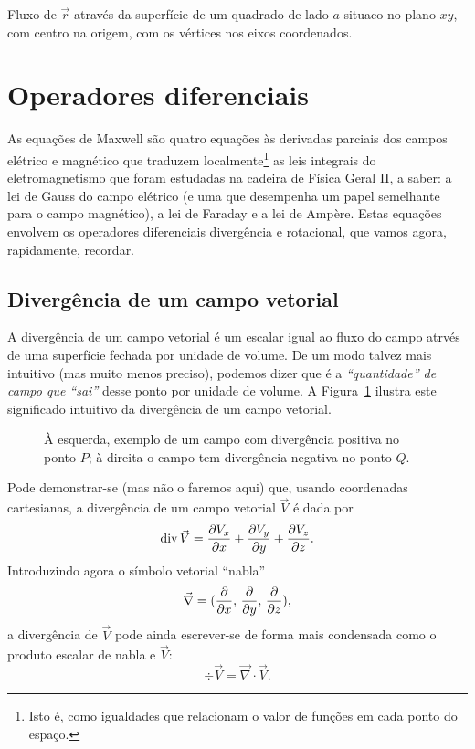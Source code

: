 \begin{examples}
\item Fluxo de $\vec r$ através da superfície de um quadrado de lado $a$ situaco
no plano $xy$, com centro na origem, com os vértices nos eixos coordenados.
\end{examples}

\section{Operadores diferenciais}
As equações de Maxwell são quatro equações às derivadas parciais dos campos
elétrico e magnético que traduzem localmente\footnote{Isto é, como igualdades
que relacionam o valor de funções em cada ponto do espaço.} as leis integrais
do eletromagnetismo que foram estudadas na cadeira de Física Geral II, a saber:
a lei de Gauss do campo elétrico (e uma que desempenha um papel semelhante para
o campo magnético), a lei de Faraday e a lei de Ampère. Estas equações envolvem
os operadores diferenciais divergência e rotacional, que vamos agora,
rapidamente, recordar.

\subsection*{Divergência de um campo vetorial}
A divergência de um campo vetorial é um escalar igual ao fluxo do campo atrvés
de uma superfície fechada por unidade de volume.  De um modo talvez mais
intuitivo (mas muito menos preciso), podemos dizer que é a \emph{``quantidade''
de campo que ``sai''} desse ponto por unidade de volume. A
Figura~\ref{fig:10-020} ilustra este significado intuitivo da divergência de um
campo vetorial.
\begin{figure}[htb]
  {\centering
    \par
  }
  \caption{À esquerda, exemplo de um campo com divergência positiva no ponto
  $P$; à direita o campo tem divergência negativa no ponto
  $Q$.\label{fig:10-020}}
\end{figure}


Pode demonstrar-se (mas não o faremos aqui) que, usando coordenadas cartesianas,
a divergência de um campo vetorial $\vec V$ é dada por
\begin{equation}\label{eq:divcart}
  \div\vec V=\pd{V_x}{x} + \pd{V_y}{y}+\pd{V_z}{z}.
\end{equation}
Introduzindo agora o símbolo vetorial ``nabla'' 
\begin{equation*}
  \vec \nabla = (\pd{}{x},\, \pd{}{y},\, \pd{}{z}),
\end{equation*}
a divergência de $\vec V$ pode ainda escrever-se de forma mais condensada como
o produto escalar de nabla e $\vec V$:
\begin{equation}
  \div\vec V=\vec\nabla\cdot\vec V.
\end{equation}

